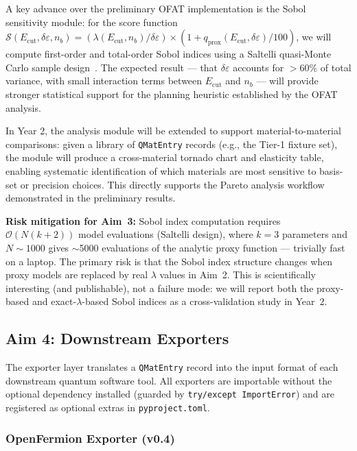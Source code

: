 \documentclass[11pt]{article}
\newcommand{\de}{\delta\varepsilon}
\newcommand{\Ecut}{E_{\mathrm{cut}}{}}
\newcommand{\nb}{{n_b}}
\newcommand{\qprox}{q_{\mathrm{prox}}}
\newcommand{\score}{\mathcal{S}}
\begin{document}
A key advance over the preliminary OFAT implementation is the Sobol
sensitivity module: for the score function
$\score(\Ecut, \de, \nb) = (\lambda(\Ecut, \nb) / \de) \times
(1 + \qprox(\Ecut, \de) / 100)$, we will compute first-order and
total-order Sobol indices using a Saltelli quasi-Monte Carlo sample
design~\cite{Saltelli2008}.
The expected result --- that $\de$ accounts for $>$60\% of total
variance, with small interaction terms between $\Ecut$ and $\nb$ ---
will provide stronger statistical support for the planning heuristic
established by the OFAT analysis.

In Year 2, the analysis module will be extended to support
material-to-material comparisons: given a library of
\texttt{QMatEntry} records (e.g., the Tier-1 fixture set), the module
will produce a cross-material tornado chart and elasticity table,
enabling systematic identification of which materials are most sensitive
to basis-set or precision choices.
This directly supports the Pareto analysis workflow demonstrated in the
preliminary results.

\textbf{Risk mitigation for Aim~3:} Sobol index computation requires
$\mathcal{O}(N(k{+}2))$ model evaluations (Saltelli design), where $k=3$
parameters and $N\sim 1000$ gives $\sim$5000 evaluations of the analytic
proxy function --- trivially fast on a laptop.
The primary risk is that the Sobol index structure changes when proxy
models are replaced by real $\lambda$ values in Aim~2.
This is scientifically interesting (and publishable), not a failure mode:
we will report both the proxy-based and exact-$\lambda$-based Sobol indices
as a cross-validation study in Year~2.

\subsection{Aim 4: Downstream Exporters}

The exporter layer translates a \texttt{QMatEntry} record into the
input format of each downstream quantum software tool.
All exporters are importable without the optional dependency installed
(guarded by \texttt{try/except ImportError}) and are registered as
optional extras in \texttt{pyproject.toml}.

\subsubsection{OpenFermion Exporter (v0.4)}
\end{document}
